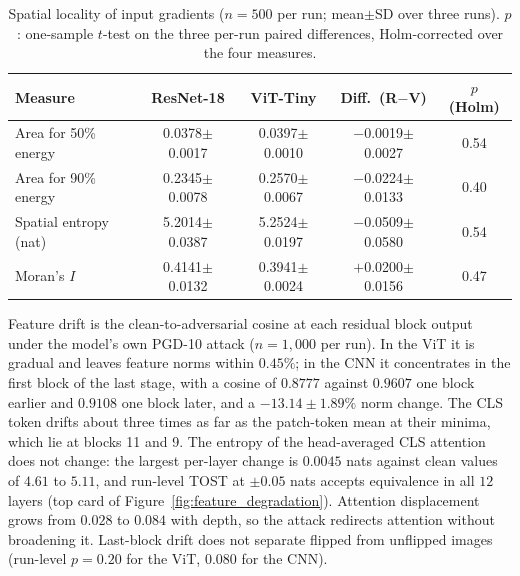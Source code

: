 \begin{table}[!t]
\centering
\caption{Spatial locality of input gradients ($n=500$ per run; mean$\pm$SD over three runs). $p$: one-sample $t$-test on the three per-run paired differences, Holm-corrected over the four measures.}
\label{tab:spatial}
\scriptsize
\setlength{\tabcolsep}{1.6pt}
\begin{tabular}{lcccc}
\toprule
\textbf{Measure} & \textbf{ResNet-18} & \textbf{ViT-Tiny} & \textbf{Diff.\ (R$-$V)} & \textbf{$p$ (Holm)} \\
\midrule
Area for 50\% energy & 0.0378$\pm$0.0017 & 0.0397$\pm$0.0010 & $-$0.0019$\pm$0.0027 & 0.54 \\
Area for 90\% energy & 0.2345$\pm$0.0078 & 0.2570$\pm$0.0067 & $-$0.0224$\pm$0.0133 & 0.40 \\
Spatial entropy (nat) & 5.2014$\pm$0.0387 & 5.2524$\pm$0.0197 & $-$0.0509$\pm$0.0580 & 0.54 \\
Moran's $I$ & 0.4141$\pm$0.0132 & 0.3941$\pm$0.0024 & $+$0.0200$\pm$0.0156 & 0.47 \\
\bottomrule
\end{tabular}
\end{table}

Feature drift is the clean-to-adversarial cosine at each residual block output under the model's own PGD-10 attack ($n = 1{,}000$ per run). In the ViT it is gradual and leaves feature norms within $0.45\%$; in the CNN it concentrates in the first block of the last stage, with a cosine of $0.8777$ against $0.9607$ one block earlier and $0.9108$ one block later, and a $-13.14\pm1.89\%$ norm change. The CLS token drifts about three times as far as the patch-token mean at their minima, which lie at blocks 11 and 9. The entropy of the head-averaged CLS attention does not change: the largest per-layer change is $0.0045$ nats against clean values of $4.61$ to $5.11$, and run-level TOST at $\pm0.05$ nats accepts equivalence in all $12$ layers (top card of Figure~\ref{fig:feature_degradation}). Attention displacement grows from $0.028$ to $0.084$ with depth, so the attack redirects attention without broadening it. Last-block drift does not separate flipped from unflipped images (run-level $p = 0.20$ for the ViT, $0.080$ for the CNN).

